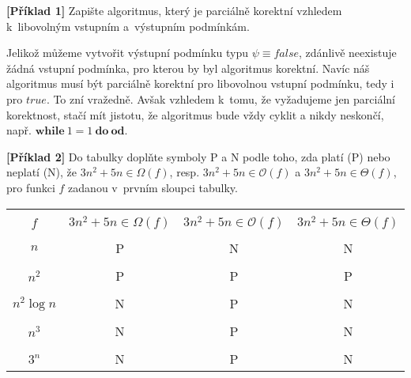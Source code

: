 \documentclass{ib002}
\begin{document}
\newcommand\N{\mathbb{N}}
\newcommand\Z{\mathbb{Z}}
\newcommand\R{\mathbb{R}}
\newcommand\bigO[1]{\mathcal{O}(#1)}

\textbf{[Příklad 1]}
Zapište algoritmus, který je parciálně korektní vzhledem k~libovolným vstupním
a~výstupním podmínkám.

Jelikož můžeme vytvořit výstupní podmínku typu $\psi \equiv false$, zdánlivě
neexistuje žádná vstupní podmínka, pro kterou by byl algoritmus korektní. Navíc
náš algoritmus musí být parciálně korektní pro libovolnou vstupní podmínku,
tedy i pro $true$. To zní vražedně. Avšak vzhledem k~tomu, že vyžadujeme jen
parciální korektnost, stačí mít jistotu, že algoritmus bude vždy cyklit a nikdy
neskončí, např. $\mathbf{while} ~1=1~ \mathbf{do ~ od}$.

\vspace{6cm}
\textbf{[Příklad 2]}
Do tabulky doplňte symboly P a N podle toho, zda platí (P) nebo neplatí (N), že
$3n^2 + 5n \in \mathit{\Omega}(f)$, resp. $3n^2 + 5n \in \bigO{f}$ a $3n^2 + 5n
\in \mathit{\Theta}(f)$, pro funkci $f$ zadanou v~prvním sloupci tabulky.

\bigskip
\begin{center}
\begin{tabular}{|c|c|c|c|}
	\hline  & & & \\[1.5ex]
	$f$ & $3n^2 + 5n \in \mathit{\Omega}(f)$
	  & $3n^2 + 5n \in \bigO{f}$
	  & $3n^2 + 5n \in \mathit{\Theta}(f)$ \\[1.5ex] 
	\hline \hline  & & & \\[1.5ex]
	$n$         & P & N & N \\ [1.5ex] \hline & & & \\[1.5ex]
	$n^2$       & P & P & P \\ [1.5ex] \hline & & & \\[1.5ex]
	$n^2\log n$ & N & P & N \\ [1.5ex] \hline & & & \\[1.5ex]
	$n^{3}$     & N & P & N \\ [1.5ex] \hline & & & \\[1.5ex]
	$3^n$       & N & P & N \\ [1.5ex] \hline %
\end{tabular}
\end{center}
\end{document}
